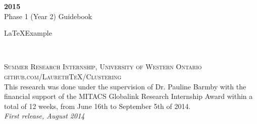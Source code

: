 \documentclass[11pt,fleqn]{book} %
\begin{document}

\begingroup
\thispagestyle{empty}
\centering
\vspace*{5cm}
\par\normalfont\fontsize{35}{35}\sffamily\selectfont
\textbf{2015}\\
{\LARGE Phase 1 (Year 2) Guidebook}\par %
\vspace*{1cm}
{\Huge \LaTeX Example}\par %
\endgroup


\newpage
~\vfill
\thispagestyle{empty}


\noindent \textsc{Summer Research Internship, University of Western Ontario}\\

\noindent \textsc{github.com/LaurethTeX/Clustering}\\ %

\noindent This research was done under the supervision of Dr. Pauline Barmby with the financial support of the MITACS Globalink Research Internship Award within a total of 12 weeks, from June 16th to September 5th of 2014.\\ %

\noindent \textit{First release, August 2014} %



\pagestyle{empty} %

\tableofcontents %

\end{document}
